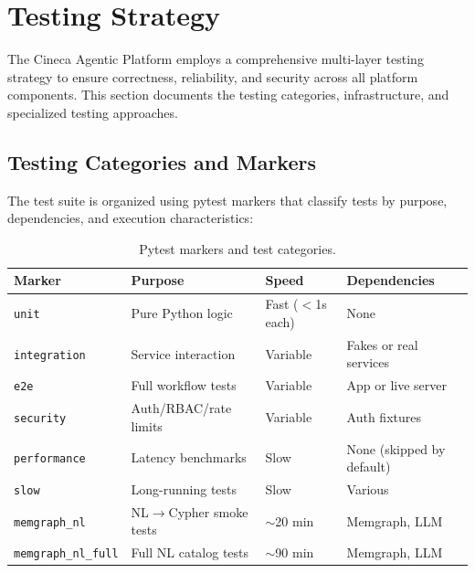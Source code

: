 
\section{Testing Strategy}
\label{sec:testing}

The Cineca Agentic Platform employs a comprehensive multi-layer testing strategy to ensure correctness, reliability, and security across all platform components. This section documents the testing categories, infrastructure, and specialized testing approaches.

\subsection{Testing Categories and Markers}

The test suite is organized using pytest markers that classify tests by purpose, dependencies, and execution characteristics:

\begin{table}[ht]
\centering
\caption{Pytest markers and test categories.}
\label{tab:pytest-markers}
\small
\begin{tabular}{llll}
\hline
\textbf{Marker} & \textbf{Purpose} & \textbf{Speed} & \textbf{Dependencies} \\
\hline
\texttt{unit} & Pure Python logic & Fast ($<$1s each) & None \\
\texttt{integration} & Service interaction & Variable & Fakes or real services \\
\texttt{e2e} & Full workflow tests & Variable & App or live server \\
\texttt{security} & Auth/RBAC/rate limits & Variable & Auth fixtures \\
\texttt{performance} & Latency benchmarks & Slow & None (skipped by default) \\
\texttt{slow} & Long-running tests & Slow & Various \\
\texttt{memgraph\_nl} & NL$\rightarrow$Cypher smoke tests & $\sim$20 min & Memgraph, LLM \\
\texttt{memgraph\_nl\_full} & Full NL catalog tests & $\sim$90 min & Memgraph, LLM \\
\hline
\end{tabular}
\end{table}

